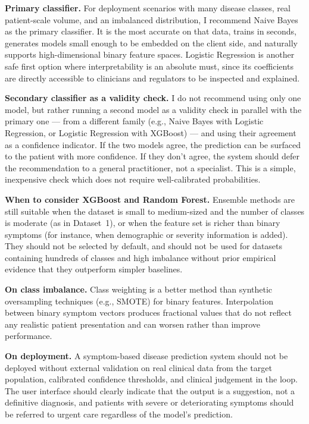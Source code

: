 \textbf{Primary classifier.} For deployment scenarios with many disease classes, real patient-scale volume, and an imbalanced distribution, I recommend Naive Bayes as the primary classifier. It is the most accurate on that data, trains in seconds, generates models small enough to be embedded on the client side, and naturally supports high-dimensional binary feature spaces. Logistic Regression is another safe first option where interpretability is an absolute must, since its coefficients are directly accessible to clinicians and regulators to be inspected and explained.

\textbf{Secondary classifier as a validity check.} I do not recommend using only one model, but rather running a second model as a validity check in parallel with the primary one --- from a different family (e.g., Naive Bayes with Logistic Regression, or Logistic Regression with XGBoost) --- and using their agreement as a confidence indicator. If the two models agree, the prediction can be surfaced to the patient with more confidence. If they don't agree, the system should defer the recommendation to a general practitioner, not a specialist. This is a simple, inexpensive check which does not require well-calibrated probabilities.

\textbf{When to consider XGBoost and Random Forest.} Ensemble methods are still suitable when the dataset is small to medium-sized and the number of classes is moderate (as in Dataset~1), or when the feature set is richer than binary symptoms (for instance, when demographic or severity information is added). They should not be selected by default, and should not be used for datasets containing hundreds of classes and high imbalance without prior empirical evidence that they outperform simpler baselines.

\textbf{On class imbalance.} Class weighting is a better method than synthetic oversampling techniques (e.g., SMOTE) for binary features. Interpolation between binary symptom vectors produces fractional values that do not reflect any realistic patient presentation and can worsen rather than improve performance.

\textbf{On deployment.} A symptom-based disease prediction system should not be deployed without external validation on real clinical data from the target population, calibrated confidence thresholds, and clinical judgement in the loop. The user interface should clearly indicate that the output is a suggestion, not a definitive diagnosis, and patients with severe or deteriorating symptoms should be referred to urgent care regardless of the model's prediction.

